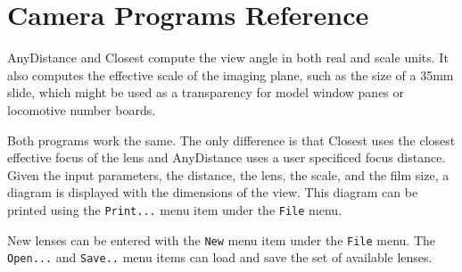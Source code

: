 

\chapter{Camera Programs Reference}
\label{chpt:camera:Reference}

AnyDistance and Closest compute the view angle in both real and scale
units. It also computes the effective scale of the imaging plane, such
as the size of a 35mm slide, which might be used as a transparency for
model window panes or locomotive number boards.

Both programs work the same. The only difference is that Closest uses
the closest effective focus of the lens and AnyDistance uses a user
specificed focus distance.  Given the input parameters, the distance,
the lens, the scale, and the film size, a diagram is displayed with the
dimensions of the view.  This diagram can be printed using the \verb=Print...=
menu item under the \verb=File= menu.

New lenses can be entered with the \verb=New= menu item under the
\verb=File= menu. The \verb=Open...= and \verb=Save..= menu items can
load and save the set of available lenses.

